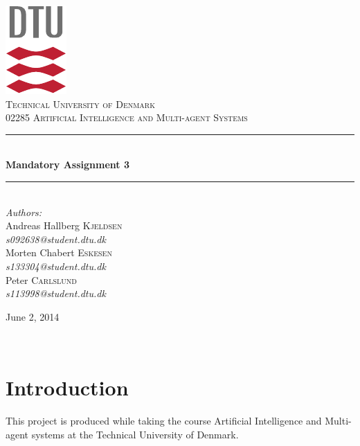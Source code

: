 \documentclass[11pt]{article}
\newcommand{\HRule}{\rule{\linewidth}{0.5mm}}
\begin{document}
\begin{titlepage}
\begin{center}

\includegraphics[scale=2.0]{../GFX/dtu_logo.pdf}\\[1cm]

\textsc{\LARGE Technical University of Denmark}\\[1.5cm]

\textsc{\Large 02285 Artificial Intelligence and Multi-agent Systems}\\[0.5cm]

\HRule \\[0.4cm]
{\huge \bfseries Mandatory Assignment 3}\\[0.1cm]
\HRule \\[1.5cm]

\large
\emph{Authors:}
\\[10pt]
Andreas Hallberg \textsc{Kjeldsen}\\
\emph{s092638@student.dtu.dk}
\\[10pt]
Morten Chabert \textsc{Eskesen}\\
\emph{s133304@student.dtu.dk}
\\[10pt]
Peter \textsc{Carlslund}\\
\emph{s113998@student.dtu.dk}

\vfill

{\large June 2, 2014}

\end{center}
\end{titlepage}

${}$
\vspace{-.55cm}

\tableofcontents
\clearpage

\section{Introduction}
This project is produced while taking the course Artificial Intelligence and Multi-agent systems at the Technical University of Denmark.
\end{document}
